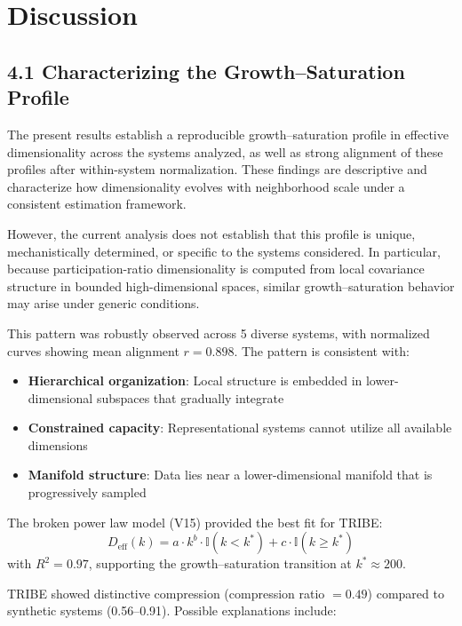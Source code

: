 \section{Discussion}

\subsection{4.1 Characterizing the Growth--Saturation Profile}

The present results establish a reproducible growth--saturation profile in effective dimensionality across the systems analyzed, as well as strong alignment of these profiles after within-system normalization. These findings are descriptive and characterize how dimensionality evolves with neighborhood scale under a consistent estimation framework.

However, the current analysis does not establish that this profile is unique, mechanistically determined, or specific to the systems considered. In particular, because participation-ratio dimensionality is computed from local covariance structure in bounded high-dimensional spaces, similar growth--saturation behavior may arise under generic conditions.

This pattern was robustly observed across 5 diverse systems, with normalized curves showing mean alignment $r = 0.898$. The pattern is consistent with:

\begin{itemize}
	\item \textbf{Hierarchical organization}: Local structure is embedded in lower-dimensional subspaces that gradually integrate
	\item \textbf{Constrained capacity}: Representational systems cannot utilize all available dimensions
	\item \textbf{Manifold structure}: Data lies near a lower-dimensional manifold that is progressively sampled
\end{itemize}

The broken power law model (V15) provided the best fit for TRIBE:
\begin{equation}
	D_{\mathrm{eff}}(k) = a \cdot k^b \cdot \mathbb{I}(k < k^*) + c \cdot \mathbb{I}(k \geq k^*)
\end{equation}
with $R^2 = 0.97$, supporting the growth--saturation transition at $k^* \approx 200$.

TRIBE showed distinctive compression (compression ratio $= 0.49$) compared to synthetic systems (0.56--0.91). Possible explanations include:


